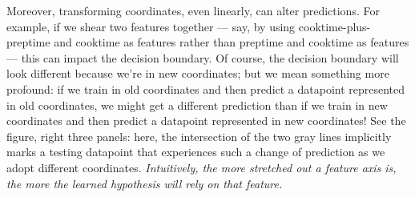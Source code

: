   \begin{marginfigure}[-1cm]
    \centering
    \caption{%
      \textbf{Relations between feature statistics and optimal weights.}
      Each of these six figures shows a different binary classification task
      along with a maximum-margin hypothesis.  We shade the datapoints that
      achieve the margin.
      ---
      \textbf{Left:} \emph{positive weights don't imply positive correlation!}
      ---
      \textbf{Right:}  \emph{presenting the same information in different
      coordinates alters predictions!}
    }
  \end{marginfigure}

  Moreover, transforming coordinates, even linearly, can alter predictions.
  For example, if we shear two features together --- say, by using
  cooktime-plus-preptime and cooktime as features rather than preptime
  and cooktime as features --- this can impact the decision boundary.
  Of course, the decision boundary will look different because we're in
  new coordinates; but we mean something more profound:
    if we train in old coordinates and then predict a datapoint represented in old coordinates,
  we might get a different prediction than
    if we train in new coordinates and then predict a datapoint represented in new coordinates!
  See the figure, right
  three panels: here, the intersection of the two gray lines implicitly marks
  a testing datapoint that experiences such a change of prediction as we adopt
  different coordinates.
  \emph{Intuitively, the more stretched out a feature axis is, the more the
  learned hypothesis will rely on that feature.}





